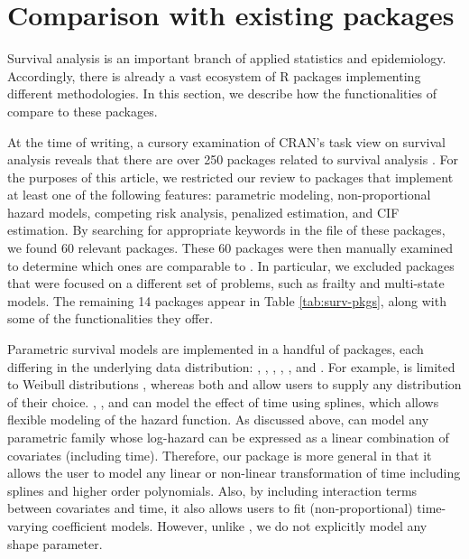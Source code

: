 \hypertarget{comparison-with-existing-packages}{%
\section{Comparison with existing
packages}\label{comparison-with-existing-packages}}

Survival analysis is an important branch of applied statistics and
epidemiology. Accordingly, there is already a vast ecosystem of
\textsf{R} packages implementing different methodologies. In this
section, we describe how the functionalities of  compare
to these packages.

At the time of writing, a cursory examination of CRAN's task view on
survival analysis reveals that there are over 250 packages related to
survival analysis \citep{survTaskView}. For the purposes of this
article, we restricted our review to packages that implement at least
one of the following features: parametric modeling, non-proportional
hazard models, competing risk analysis, penalized estimation, and CIF
estimation. By searching for appropriate keywords in the
 file of these packages, we found 60 relevant
packages. These 60 packages were then manually examined to determine
which ones are comparable to . In particular, we excluded
packages that were focused on a different set of problems, such as
frailty and multi-state models. The remaining 14 packages appear in
Table \ref{tab:surv-pkgs}, along with some of the functionalities they
offer.

Parametric survival models are implemented in a handful of packages,
each differing in the underlying data distribution: 
\citeyearpar{mahani2015bayesian},  \citeyearpar{flexsurv},
 \citeyearpar{smoothHazard}, 
\citeyearpar{clements_liu}, 
\citeyearpar{scheike2014estimating}, and 
\citeyearpar{survival-package}. For example,  is
limited to Weibull distributions \citeyearpar{smoothHazard}, whereas
both  and  allow users to supply any
distribution of their choice. , ,
 and  can model the effect of time using splines,
which allows flexible modeling of the hazard function. As discussed
above,  can model any parametric family whose log-hazard
can be expressed as a linear combination of covariates (including time).
Therefore, our package is more general in that it allows the user to
model any linear or non-linear transformation of time including splines
and higher order polynomials. Also, by including interaction terms
between covariates and time, it also allows users to fit
(non-proportional) time-varying coefficient models. However, unlike
, we do not explicitly model any shape parameter.

